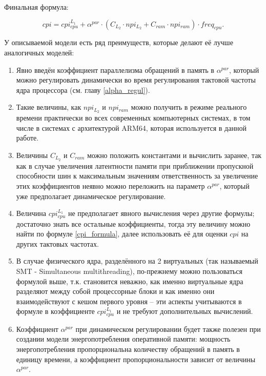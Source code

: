     Финальная формула:

    \begin{equation} \label{cpi_formula}
        cpi = cpi_{cpu}^{L_1} + \alpha^{par} \cdot
        \left( C_{L_2} \cdot npi_{L_2} + C_{ram} \cdot npi_{ram} \right) \cdot freq_{cpu}.
    \end{equation}

    У описываемой модели есть ряд преимуществ, которые делают её лучше аналогичных моделей:
    \begin{enumerate}
        \item Явно введён коэффициент параллелизма обращений в память в $\alpha^{par}$, который можно
        регулировать динамически во время регулирования тактовой частоты ядра процессора
        (см. главу \ref{alpha_regul}).
        \item Такие величины, как $npi_{L_2}$ и $npi_{ram}$ можно получить в режиме реального времени
        практически во всех современных компьютерных системах, в том числе в системах с архитектурой ARM64,
        которая используется в данной работе.
        \item Величины $C_{L_2}$ и $C_{ram}$ можно положить константами и вычислить заранее, так как
        в случае увеличения латентности памяти при приближении пропускной способности шин к максимальным
        значениям ответственность за увеличение этих коэффициентов неявно можно переложить на параметр
        $\alpha^{par}$, который уже предполагает динамическое регулирование.
        \item Величина $cpi_{cpu}^{L_1}$ не предполагает явного вычисления через другие формулы;
        достаточно знать все остальные коэффициенты, тогда эту величину можно найти по формуле
        \eqref{cpi_formula}, далее использовать её для оценки $cpi$ на других тактовых частотах.
        \item В случае физического ядра, разделённого на 2 виртуальных (так называемый
        SMT - Simultaneous multithreading), по-прежнему можно пользоваться формулой выше, т.к.
        становится неважно, как именно виртуальные ядра разделяют между собой процессорные блоки
        и как именно они взаимодействуют с кешом первого уровня -- эти аспекты учитываются
        в формуле в коэффициенте $cpi_{cpu}^{L_1}$ и не требуют дополнительных вычислений.
        \item Коэффициент $\alpha^{par}$ при динамическом регулировании будет также полезен при
        создании модели энергопотребления оперативной памяти: мощность энергопотребления пропорциональна
        количеству обращений в память в единицу времени, а коэффициент пропорциональности зависит от величины
        $\alpha^{par}$.
    \end{enumerate}

